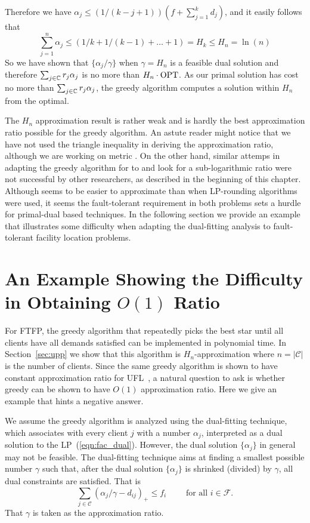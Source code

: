 \documentclass[oneside,final]{ucr}
\begin{document}
Therefore we have $\alpha_j \leq (1/(k-j+1)) (f +
\sum_{j=1}^k d_j)$, and it easily follows that
\begin{equation}
  \sum_{j=1}^n \alpha_j \leq (1/k + 1/(k-1) + \ldots + 1) =
  H_k \leq H_n = \ln(n)
\end{equation}
So we have shown that $\{\alpha_j / \gamma\}$ when $\gamma =
H_n$ is a feasible dual solution and therefore
$\sum_{j\in\mathbb{C}} r_j \alpha_j$ is no more than
$H_n\cdot \mbox{\rm OPT}$. As our primal solution has cost no more
than $\sum_{j\in\mathbb{C}} r_j \alpha_j$, the greedy
algorithm computes a solution within $H_n$ from the optimal.

The $H_n$ approximation result is rather weak and is hardly
the best approximation ratio possible for the greedy
algorithm. An astute reader might notice that we have not
used the triangle inequality in deriving the approximation
ratio, although we are working on metric {\FTFP}. On the
other hand, similar attemps in adapting the greedy algorithm
for {\UFL} to {\FTFL} and look for a sub-logarithmic ratio
were not successful by other researchers, as described in
the beginning of this chapter. Although {\FTFP} seems to be
easier to approximate than {\FTFL} when LP-rounding
algorithms were used, it seems the fault-tolerant
requirement in both problems sets a hurdle for primal-dual
based techniques. In the following section we provide an
example that illustrates some difficulty when adapting the
dual-fitting analysis to fault-tolerant facility location
problems.

\section{An Example Showing the Difficulty in Obtaining
  $O(1)$ Ratio}

For FTFP, the greedy algorithm that repeatedly picks the
best star until all clients have all demands satisfied can
be implemented in polynomial time. In Section~\ref{sec:upp}
we show that this algorithm is $H_n$-approximation where
$n=|\mathcal C|$ is the number of clients. Since the same
greedy algorithm is shown to have constant approximation
ratio for UFL~\cite{MahdianMSV01}, a natural question to ask
is whether greedy can be shown to have $O(1)$ approximation
ratio. Here we give an example that hints a negative answer.

We assume the greedy algorithm is analyzed using the
dual-fitting technique, which associates with every client
$j$ with a number $\alpha_j$, interpreted as a dual solution
to the LP~(\ref{eqn:fac_dual}). However, the dual solution
$\{\alpha_j\}$ in general may not be feasible. The
dual-fitting technique aims at finding a smallest possible
number $\gamma$ such that, after the dual solution
$\{\alpha_j\}$ is shrinked (divided) by $\gamma$, all dual
constraints are satisfied. That is
\begin{equation*}
\sum_{j\in \mathcal C} (\alpha_j/\gamma
- d_{ij})_+ \leq f_i \qquad \text{ for all } i\in \mathcal F. 
\end{equation*}
That $\gamma$ is taken as the approximation ratio.
\end{document}
